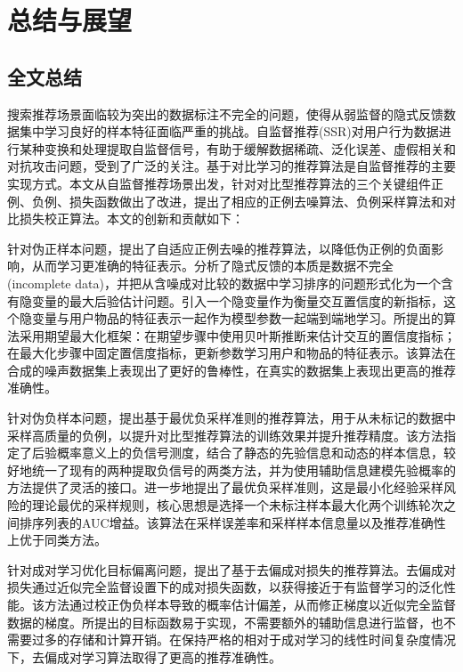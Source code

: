 
\chapter{总结与展望}
\label{cha:conclusion}

\section{全文总结}
\label{sec:conclusion}
搜索推荐场景面临较为突出的数据标注不完全的问题，使得从弱监督的隐式反馈数据集中学习良好的样本特征面临严重的挑战。自监督推荐(SSR)对用户行为数据进行某种变换和处理提取自监督信号，有助于缓解数据稀疏、泛化误差、虚假相关和对抗攻击问题，受到了广泛的关注。基于对比学习的推荐算法是自监督推荐的主要实现方式。本文从自监督推荐场景出发，针对对比型推荐算法的三个关键组件正例、负例、损失函数做出了改进，提出了相应的正例去噪算法、负例采样算法和对比损失校正算法。本文的创新和贡献如下：

针对伪正样本问题，提出了自适应正例去噪的推荐算法，以降低伪正例的负面影响，从而学习更准确的特征表示。分析了隐式反馈的本质是数据不完全(incomplete data)，并把从含噪成对比较的数据中学习排序的问题形式化为一个含有隐变量的最大后验估计问题。引入一个隐变量作为衡量交互置信度的新指标，这个隐变量与用户物品的特征表示一起作为模型参数一起端到端地学习。所提出的算法采用期望最大化框架：在期望步骤中使用贝叶斯推断来估计交互的置信度指标；在最大化步骤中固定置信度指标，更新参数学习用户和物品的特征表示。该算法在合成的噪声数据集上表现出了更好的鲁棒性，在真实的数据集上表现出更高的推荐准确性。

针对伪负样本问题，提出基于最优负采样准则的推荐算法，用于从未标记的数据中采样高质量的负例，以提升对比型推荐算法的训练效果并提升推荐精度。该方法指定了后验概率意义上的负信号测度，结合了静态的先验信息和动态的样本信息，较好地统一了现有的两种提取负信号的两类方法，并为使用辅助信息建模先验概率的方法提供了灵活的接口。进一步地提出了最优负采样准则，这是最小化经验采样风险的理论最优的采样规则，核心思想是选择一个未标注样本最大化两个训练轮次之间排序列表的AUC增益。该算法在采样误差率和采样样本信息量以及推荐准确性上优于同类方法。

针对成对学习优化目标偏离问题，提出了基于去偏成对损失的推荐算法。去偏成对损失通过近似完全监督设置下的成对损失函数，以获得接近于有监督学习的泛化性能。该方法通过校正伪负样本导致的概率估计偏差，从而修正梯度以近似完全监督数据的梯度。所提出的目标函数易于实现，不需要额外的辅助信息进行监督，也不需要过多的存储和计算开销。在保持严格的相对于成对学习的线性时间复杂度情况下，去偏成对学习算法取得了更高的推荐准确性。

